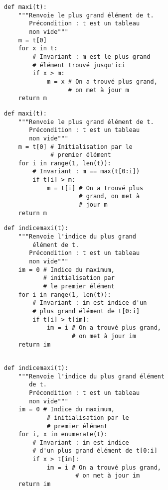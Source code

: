 \exer{}
\setcounter{numques}{0}

\begin{lstlisting}
def maxi(t):
    """Renvoie le plus grand élément de t.
       Précondition : t est un tableau 
       non vide"""
    m = t[0]
    for x in t:
        # Invariant : m est le plus grand 
        # élément trouvé jusqu'ici
        if x > m:
            m = x # On a trouvé plus grand, 
                  # on met à jour m
    return m
\end{lstlisting}


\begin{lstlisting}
def maxi(t):
    """Renvoie le plus grand élément de t.
       Précondition : t est un tableau 
       non vide"""
    m = t[0] # Initialisation par le 
             # premier élément
    for i in range(1, len(t)):
        # Invariant : m == max(t[0:i])
        if t[i] > m:
            m = t[i] # On a trouvé plus
                     # grand, on met à 
                     # jour m
    return m
\end{lstlisting}


\begin{lstlisting}
def indicemaxi(t):
    """Renvoie l'indice du plus grand 
        élément de t.
       Précondition : t est un tableau 
       non vide"""
    im = 0 # Indice du maximum, 
           # initialisation par 
           # le premier élément
    for i in range(1, len(t)):
        # Invariant : im est indice d'un 
        # plus grand élément de t[0:i]
        if t[i] > t[im]:
            im = i # On a trouvé plus grand, 
                   # on met à jour im
    return im
    
\end{lstlisting}



\begin{lstlisting}
def indicemaxi(t):
    """Renvoie l'indice du plus grand élément 
       de t.
       Précondition : t est un tableau 
       non vide"""
    im = 0 # Indice du maximum, 
            # initialisation par le 
            # premier élément
    for i, x in enumerate(t):
        # Invariant : im est indice 
        # d'un plus grand élément de t[0:i]
        if x > t[im]:
            im = i # On a trouvé plus grand, 
                    # on met à jour im
    return im
\end{lstlisting}
